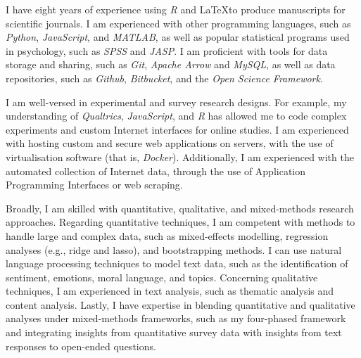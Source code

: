 

\begin{small} \color{black}

I have eight years of experience using \textit{R} and \LaTeX to produce manuscripts for scientific journals. I am experienced with other programming languages, such as \textit{Python}, \textit{JavaScript}, and \textit{MATLAB}, as well as popular statistical programs used in psychology, such as \textit{SPSS} and \textit{JASP}. I am proficient with tools for data storage and sharing, such as \textit{Git}, \textit{Apache Arrow} and \textit{MySQL}, as well as data repositories, such as \textit{Github}, \textit{Bitbucket}, and the \textit{Open Science Framework}.

I am well-versed in experimental and survey research designs. For example, my understanding of \textit{Qualtrics}, \textit{JavaScript}, and \textit{R} has allowed me to code complex experiments and custom Internet interfaces for online studies. I am experienced with hosting custom and secure web applications on servers, with the use of virtualisation software (that is, \textit{Docker}). Additionally, I am experienced with the automated collection of Internet data, through the use of Application Programming Interfaces or web scraping.

Broadly, I am skilled with quantitative, qualitative, and mixed-methods research approaches. Regarding quantitative techniques, I am competent with methods to handle large and complex data, such as mixed-effects modelling, regression analyses (e.g., ridge and lasso), and bootstrapping methods. I can use natural language processing techniques to model text data, such as the identification of sentiment, emotions, moral language, and topics. Concerning qualitative techniques, I am experienced in text analysis, such as thematic analysis and content analysis. Lastly, I have expertise in blending quantitative and qualitative analyses under mixed-methods frameworks, such as my four-phased framework \parencite{andreotta2019} and integrating insights from quantitative survey data with insights from text responses to open-ended questions.


\printbibliography[heading=none]

\end{small}

